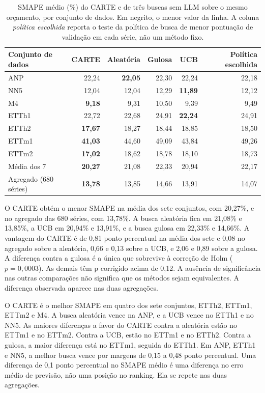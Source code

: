 \begin{table}[H]
\centering
\small
\caption[SMAPE do CARTE e das buscas sem LLM.]{SMAPE médio (\%) do CARTE e de três buscas sem LLM sobre o mesmo orçamento, por conjunto de dados. Em negrito, o menor valor da linha. A coluna \textit{política escolhida} reporta o teste da política de busca de menor pontuação de validação em cada série, não um método fixo.}
\label{tab:ablacao-buscas-smape}
\begin{tabular}{@{}lrrrrr@{}}
\toprule
\textbf{Conjunto de dados} & \textbf{CARTE} & \textbf{Aleatória} & \textbf{Gulosa} & \textbf{UCB} & \textbf{Política escolhida} \\
\midrule
ANP    & 22,24 & \textbf{22,05} & 22,30 & 22,24 & 22,18 \\
NN5    & 12,04 & 12,04 & 12,29 & \textbf{11,89} & 12,12 \\
M4     & \textbf{9,18} & 9,31 & 10,50 & 9,39 & 9,49 \\
ETTh1  & 22,72 & 22,68 & 24,91 & \textbf{22,24} & 24,91 \\
ETTh2  & \textbf{17,67} & 18,27 & 18,44 & 18,85 & 18,50 \\
ETTm1  & \textbf{41,03} & 44,60 & 49,09 & 43,84 & 49,26 \\
ETTm2  & \textbf{17,02} & 18,62 & 18,78 & 18,10 & 18,73 \\
\midrule
Média dos 7 & \textbf{20,27} & 21,08 & 22,33 & 20,94 & 22,17 \\
Agregado (680 séries) & \textbf{13,78} & 13,85 & 14,66 & 13,91 & 14,07 \\
\bottomrule
\end{tabular}
\end{table}

O CARTE obtém o menor SMAPE na média dos sete conjuntos, com 20,27\%, e no agregado das 680 séries, com 13,78\%. A busca aleatória fica em 21,08\% e 13,85\%, a UCB em 20,94\% e 13,91\%, e a busca gulosa em 22,33\% e 14,66\%. A vantagem do CARTE é de 0,81 ponto percentual na média dos sete e 0,08 no agregado sobre a aleatória, 0,66 e 0,13 sobre a UCB, e 2,06 e 0,89 sobre a gulosa. A diferença contra a gulosa é a única que sobrevive à correção de Holm ($p = 0{,}0003$). As demais têm p corrigido acima de 0,12. A ausência de significância nas outras comparações não significa que os métodos sejam equivalentes. A diferença observada aparece nas duas agregações.

O CARTE é o melhor SMAPE em quatro dos sete conjuntos, ETTh2, ETTm1, ETTm2 e M4. A busca aleatória vence na ANP, e a UCB vence no ETTh1 e no NN5. As maiores diferenças a favor do CARTE contra a aleatória estão no ETTm1 e no ETTm2. Contra a UCB, estão no ETTm1 e no ETTh2. Contra a gulosa, a maior diferença está no ETTm1, seguida do ETTh1. Em ANP, ETTh1 e NN5, a melhor busca vence por margens de 0,15 a 0,48 ponto percentual. Uma diferença de 0,1 ponto percentual no SMAPE médio é uma diferença no erro médio de previsão, não uma posição no ranking. Ela se repete nas duas agregações.


